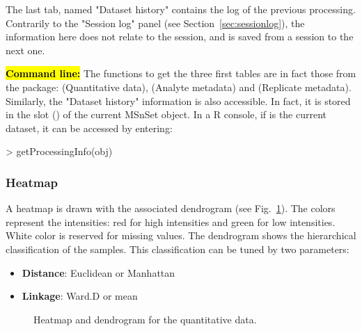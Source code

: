 \documentclass[12pt]{article}
\begin{document}
The last tab, named "Dataset history" contains the log of the previous 
processing. Contrarily to the "Session log" panel (see 
Section~\ref{sec:sessionlog}), the information here does not relate to the 
session, and is saved from a session to the next one.

\hl{\bf Command line:}  The  functions to get the three first 
tables are in fact those from the  package: 
 (Quantitative data),  
(Analyte metadata) and  (Replicate metadata). 
Similarly, the "Dataset history" information is also accessible. In fact, 
it is stored in the slot () of the current MSnSet 
object. In a R console, if  is the current dataset, it can be 
accessed by entering:
\begin{Schunk}
\begin{Sinput}
> getProcessingInfo(obj)
\end{Sinput}
\end{Schunk}

\subsubsection {Heatmap}
A heatmap is drawn with the associated dendrogram (see Fig.~\ref{fig:sdhm}). 
The colors represent the intensities: red for high intensities and green for 
low intensities. White color is reserved for missing values.
The dendrogram shows the hierarchical classification of the samples. This 
classification can be tuned by two parameters:
\begin {itemize}
\item \textbf{Distance}: Euclidean or Manhattan
\item \textbf{Linkage}: Ward.D or mean
\end {itemize}

\begin {figure}
\centering
{}
\caption{Heatmap and dendrogram for the quantitative data.}\label{fig:sdhm}
\end {figure}
\end{document}
